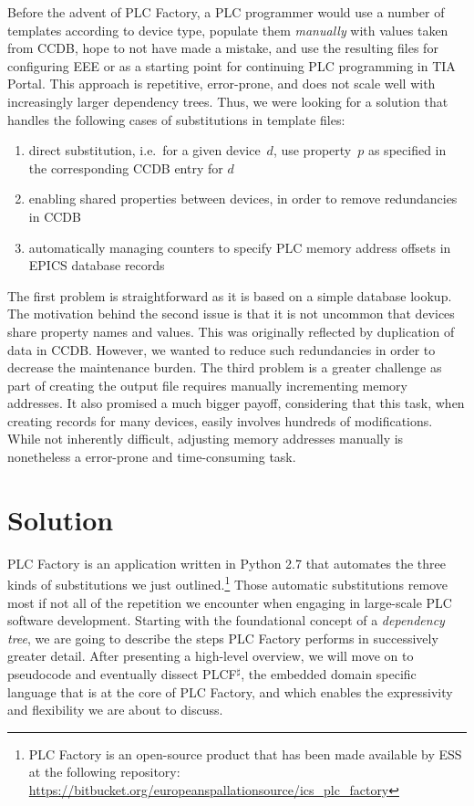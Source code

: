 \documentclass[a4paper,
              ]{jacow}
\begin{document}
Before the advent of PLC Factory, a PLC programmer would use a number of templates according to device type, populate them \emph{manually} with values taken from CCDB, hope to not have made a mistake, and use the resulting files for configuring EEE or as a starting point for continuing PLC programming in TIA Portal. This approach is repetitive, error-prone, and does not scale well with increasingly larger dependency trees. Thus, we were looking for a solution that handles the following cases of substitutions in template files:

\begin{enumerate}

\item direct substitution, i.e.\ for a given device~$d$, use property~$p$ as specified in the corresponding CCDB entry for $d$

\item enabling shared properties between devices, in order to remove redundancies in CCDB

\item automatically managing counters to specify PLC memory address offsets in EPICS database records

\end{enumerate}

The first problem is straightforward as it is based on a simple database lookup. The motivation behind the second issue is that it is not uncommon that devices share property names and values. This was originally reflected by duplication of data in CCDB. However, we wanted to reduce such redundancies in order to decrease the maintenance burden. The third problem is a greater challenge as part of creating the output file requires manually incrementing memory addresses. It also promised a much bigger payoff, considering that this task, when creating records for many devices, easily involves hundreds of modifications. While not inherently difficult, adjusting memory addresses manually is nonetheless a error-prone and time-consuming task. 



\section{Solution}
PLC Factory is an application written in Python 2.7 that automates the three kinds of substitutions we just outlined.\footnote{PLC Factory is an open-source product that has been made available by ESS at the following repository: \url{https://bitbucket.org/europeanspallationsource/ics_plc_factory} } Those automatic substitutions remove most if not all of the repetition we encounter when engaging in large-scale PLC software development. Starting with the foundational concept of a \emph{dependency tree}, we are going to describe the steps PLC Factory performs in successively greater detail. After presenting a high-level overview, we will move on to pseudocode and eventually dissect PLCF$^\sharp$, the embedded domain specific language that is at the core of PLC Factory, and which enables the expressivity and flexibility we are about to discuss.
\end{document}
